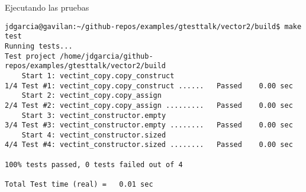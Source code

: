 \begin{frame}[t,fragile]{Ejecutando las pruebas}
\begin{lstlisting}[style=terminal]
jdgarcia@gavilan:~/github-repos/examples/gtesttalk/vector2/build$ make test
Running tests...
Test project /home/jdgarcia/github-repos/examples/gtesttalk/vector2/build
    Start 1: vectint_copy.copy_construct
1/4 Test #1: vectint_copy.copy_construct ......   Passed    0.00 sec
    Start 2: vectint_copy.copy_assign
2/4 Test #2: vectint_copy.copy_assign .........   Passed    0.00 sec
    Start 3: vectint_constructor.empty
3/4 Test #3: vectint_constructor.empty ........   Passed    0.00 sec
    Start 4: vectint_constructor.sized
4/4 Test #4: vectint_constructor.sized ........   Passed    0.00 sec

100% tests passed, 0 tests failed out of 4

Total Test time (real) =   0.01 sec
\end{lstlisting}
\end{frame}



